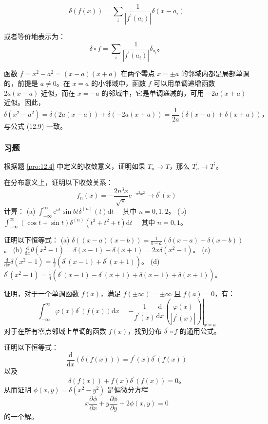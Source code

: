 \begin{equation}\label{eq:12.9}
 \delta(f(x)) = \sum_{i} \frac{1}{\left|f^{\prime}(a_i)\right|} \delta(x - a_i) 
 \end{equation}

或者等价地表示为：
 $$
\delta \circ f = \sum_{i} \frac{1}{\left|f^{\prime}(a_i)\right|} \delta_{a_i}。
$$
\begin{eg} \label{eg:12.7} 
函数 $f = x^2 - a^2 = (x - a)(x + a)$ 在两个零点
$x = \pm a$ 的邻域内都是局部单调的，前提是 $a \neq 0$。在 $x = a$
的小邻域中，函数 $f$ 可以用单调递增函数 $2a(x - a)$ 近似，而在
$x = -a$ 的邻域中，它是单调递减的，可用 $-2a(x + a)$ 近似。因此，
 $$
\delta(x^2 - a^2) = \delta(2a(x - a)) + \delta(-2a(x + a)) = \frac{1}{2a}(\delta(x - a) + \delta(x + a))，
$$
与公式 (12.9) 一致。
\end{eg}

\subsubsection*{习题}
\begin{problem}
  根据题 \ref{pro:12.4} 中定义的收敛意义，证明如果
$T_n \rightarrow T$，那么 $T_n^{\prime} \rightarrow T^{\prime}$。


在分布意义上，证明以下收敛关系：
 $$
f_n(x) = -\frac{2 n^3 x}{\sqrt{\pi}} \mathrm{e}^{-n^2 x^2} \rightarrow \delta^{\prime}(x)
$$
计算： (a)
$\int_{-\infty}^\infty \mathrm{e}^{a t} \sin b t \delta^{(n)}(t) \mathrm{d}t \quad$
其中 $n=0,1,2$。 (b)
$\int_{-\infty}^\infty (\cos t + \sin t) \delta^{(n)}\left(t^3 + t^2 + t\right) \mathrm{d}t \quad$
其中 $n=0,1$。
\end{problem}
\begin{problem} 证明以下恒等式： (a)
$\delta((x-a)(x-b)) = \frac{1}{b-a}(\delta(x-a) + \delta(x-b))$。 (b)
$\frac{\mathrm{d}}{\mathrm{d}x} \theta(x^2-1) = \delta(x-1) - \delta(x+1) = 2x \delta(x^2-1)$。
(c)
$\frac{\mathrm{d}}{\mathrm{d}x} \delta(x^2-1) = \frac{1}{2}\left(\delta^{\prime}(x-1) + \delta^{\prime}(x+1)\right)$。
(d)
$\delta^{\prime}(x^2-1) = \frac{1}{4}\left(\delta^{\prime}(x-1) - \delta^{\prime}(x+1) + \delta(x-1) + \delta(x+1)\right)$。

\end{problem}

\begin{problem}
  证明，对于一个单调函数 $f(x)$，满足
$f(\pm \infty) = \pm \infty$ 且 $f(a) = 0$，有：
 $$
\int_{-\infty}^\infty \varphi(x) \delta^{\prime}(f(x)) \mathrm{d}x = -\left.\frac{1}{f^{\prime}(x)} \frac{\mathrm{d}}{\mathrm{d}x}\left(\frac{\varphi(x)}{\left|f^{\prime}(x)\right|}\right)\right|_{x=a}
$$
对于在所有零点邻域上单调的函数 $f(x)$，找到分布
$\delta^{\prime} \circ f$ 的通用公式。
\end{problem} 
\begin{problem}
  证明以下恒等式：
 $$
\frac{\mathrm{d}}{\mathrm{d}x} (\delta(f(x))) = f^{\prime}(x) \delta^{\prime}(f(x))
$$
以及
 $$
\delta(f(x)) + f(x) \delta^{\prime}(f(x)) = 0。
$$
从而证明 $\phi(x, y) = \delta(x^2 - y^2)$ 是偏微分方程
 $$
x \frac{\partial \phi}{\partial x} + y \frac{\partial \phi}{\partial y} + 2 \phi(x, y) = 0
$$
的一个解。
\end{problem}


